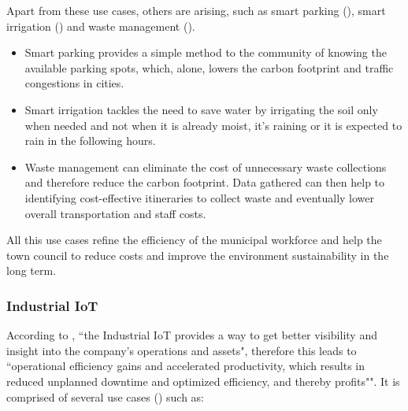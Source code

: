 Apart from these use cases, others are arising, such as smart parking (\cite{GOAP201841}), smart irrigation (\cite{7562735}) and waste management (\cite{7972276}).
\begin{itemize}
    \item Smart parking provides a simple method to the community of knowing the available parking spots, which, alone, lowers the carbon footprint and traffic congestions in cities.

    \item Smart irrigation tackles the need to save water by irrigating the soil only when needed and not when it is already moist, it's raining or it is expected to rain in the following hours.

    \item Waste management can eliminate the cost of unnecessary waste collections and therefore reduce the carbon footprint. Data gathered can then help to identifying cost-effective itineraries to collect waste and eventually lower overall transportation and staff costs.
\end{itemize}

All this use cases refine the efficiency of the municipal workforce and help the town council to reduce costs and improve the environment sustainability in the long term.

\subsubsection{Industrial IoT}
\label{subsubsec:stateofart:iot:areas:industry}

According to \cite{iiot}, ``the Industrial \gls{IoT} provides a way to get better visibility and insight into the company's operations and assets", therefore this leads to ``operational efficiency gains and accelerated productivity, which results in reduced unplanned downtime and optimized efficiency, and thereby profits"".
It is comprised of several use cases (\cite{iiot-cases}) such as:

